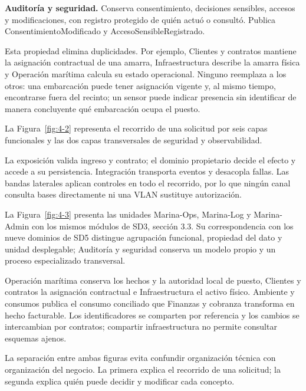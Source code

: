\textbf{Auditoría y seguridad.} Conserva consentimiento, decisiones sensibles, accesos y modificaciones, con registro protegido de quién actuó o consultó. Publica ConsentimientoModificado y AccesoSensibleRegistrado.

Esta propiedad elimina duplicidades. Por ejemplo, Clientes y contratos mantiene la asignación contractual de una amarra, Infraestructura describe la amarra física y Operación marítima calcula su estado operacional. Ninguno reemplaza a los otros: una embarcación puede tener asignación vigente y, al mismo tiempo, encontrarse fuera del recinto; un sensor puede indicar presencia sin identificar de manera concluyente qué embarcación ocupa el puesto.

La Figura~\ref{fig:4-2} representa el recorrido de una solicitud por seis capas funcionales y las dos capas transversales de seguridad y observabilidad.



La exposición valida ingreso y contrato; el dominio propietario decide el efecto y accede a su persistencia. Integración transporta eventos y desacopla fallas. Las bandas laterales aplican controles en todo el recorrido, por lo que ningún canal consulta bases directamente ni una VLAN sustituye autorización.


La Figura~\ref{fig:4-3} presenta las unidades Marina-Ops, Marina-Log y Marina-Admin con los mismos módulos de SD3, sección 3.3. Su correspondencia con los nueve dominios de SD5 distingue agrupación funcional, propiedad del dato y unidad desplegable; Auditoría y seguridad conserva un modelo propio y un proceso especializado transversal.



Operación marítima conserva los hechos y la autoridad local de puesto, Clientes y contratos la asignación contractual e Infraestructura el activo físico. Ambiente y consumos publica el consumo conciliado que Finanzas y cobranza transforma en hecho facturable. Los identificadores se comparten por referencia y los cambios se intercambian por contratos; compartir infraestructura no permite consultar esquemas ajenos.


La separación entre ambas figuras evita confundir organización técnica con organización del negocio. La primera explica el recorrido de una solicitud; la segunda explica quién puede decidir y modificar cada concepto.



